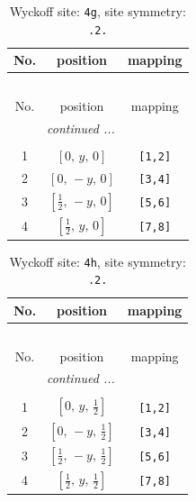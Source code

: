 \documentclass[fleqn,8pt]{jsarticle}
\begin{document}
\begin{longtable}{ccc}
\caption{Wyckoff site: {\tt 4g}, site symmetry: {\tt .2.}}
 \\
 \hline \hline
No. & position & mapping \\ \hline \endfirsthead

\multicolumn{2}{l}{\tablename\ \thetable{}} \\
 \hline \hline
No. & position & mapping \\ \hline \endhead

 \hline \hline
\multicolumn{2}{r}{\footnotesize\it continued ...} \\ \endfoot

 \hline \hline
\multicolumn{2}{r}{} \\ \endlastfoot

1 & $\left[ 0,\, y,\, 0 \right]$ & {\tt [1,2]} \\ \hline
2 & $\left[ 0,\, - y,\, 0 \right]$ & {\tt [3,4]} \\ \hline
3 & $\left[ \frac{1}{2},\, - y,\, 0 \right]$ & {\tt [5,6]} \\ \hline
4 & $\left[ \frac{1}{2},\, y,\, 0 \right]$ & {\tt [7,8]} \\
\end{longtable}
\renewcommand{\arraystretch}{1.2}
\begin{longtable}{ccc}
\caption{Wyckoff site: {\tt 4h}, site symmetry: {\tt .2.}}
 \\
 \hline \hline
No. & position & mapping \\ \hline \endfirsthead

\multicolumn{2}{l}{\tablename\ \thetable{}} \\
 \hline \hline
No. & position & mapping \\ \hline \endhead

 \hline \hline
\multicolumn{2}{r}{\footnotesize\it continued ...} \\ \endfoot

 \hline \hline
\multicolumn{2}{r}{} \\ \endlastfoot

1 & $\left[ 0,\, y,\, \frac{1}{2} \right]$ & {\tt [1,2]} \\ \hline
2 & $\left[ 0,\, - y,\, \frac{1}{2} \right]$ & {\tt [3,4]} \\ \hline
3 & $\left[ \frac{1}{2},\, - y,\, \frac{1}{2} \right]$ & {\tt [5,6]} \\ \hline
4 & $\left[ \frac{1}{2},\, y,\, \frac{1}{2} \right]$ & {\tt [7,8]} \\
\end{longtable}
\end{document}
